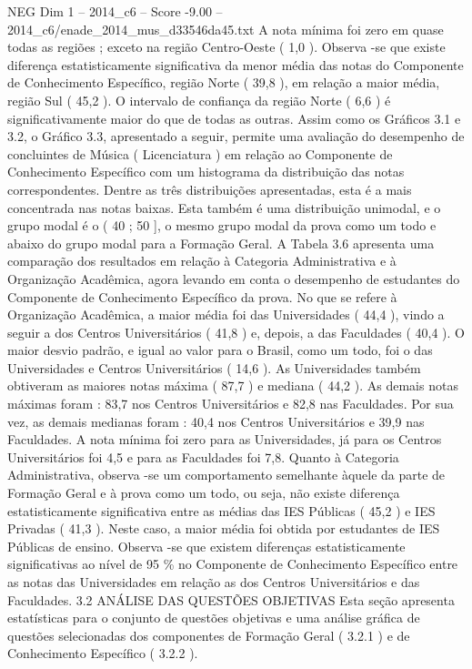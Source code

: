 \begin{textsample}{NEG Dim 1 – 2014\_c6 – Score -9.00 – 2014\_c6/enade\_2014\_mus\_d33546da45.txt}
A nota mínima foi zero em quase todas as regiões ; exceto na região Centro-Oeste ( 1,0 ).
Observa -se que existe diferença estatisticamente significativa da menor média das notas do Componente de Conhecimento Específico, região Norte ( 39,8 ), em relação a maior média, região Sul ( 45,2 ).
O intervalo de confiança da região Norte ( 6,6 ) é significativamente maior do que de todas as outras.
Assim como os Gráficos 3.1 e 3.2, o Gráfico 3.3, apresentado a seguir, permite uma avaliação do desempenho de concluintes de Música ( Licenciatura ) em relação ao Componente de Conhecimento Específico com um histograma da distribuição das notas correspondentes.
Dentre as três distribuições apresentadas, esta é a mais concentrada nas notas baixas.
Esta também é uma distribuição unimodal, e o grupo modal é o ( 40 ; 50 ], o mesmo grupo modal da prova como um todo e abaixo do grupo modal para a Formação Geral.
A Tabela 3.6 apresenta uma comparação dos resultados em relação à Categoria Administrativa e à Organização Acadêmica, agora levando em conta o desempenho de estudantes do Componente de Conhecimento Específico da prova.
No que se refere à Organização Acadêmica, a maior média foi das Universidades ( 44,4 ), vindo a seguir a dos Centros Universitários ( 41,8 ) e, depois, a das Faculdades ( 40,4 ).
O maior desvio padrão, e igual ao valor para o Brasil, como um todo, foi o das Universidades e Centros Universitários ( 14,6 ).
As Universidades também obtiveram as maiores notas máxima ( 87,7 ) e mediana ( 44,2 ).
As demais notas máximas foram : 83,7 nos Centros Universitários e 82,8 nas Faculdades.
Por sua vez, as demais medianas foram : 40,4 nos Centros Universitários e 39,9 nas Faculdades.
A nota mínima foi zero para as Universidades, já para os Centros Universitários foi 4,5 e para as Faculdades foi 7,8.
Quanto à Categoria Administrativa, observa -se um comportamento semelhante àquele da parte de Formação Geral e à prova como um todo, ou seja, não existe diferença estatisticamente significativa entre as médias das IES Públicas ( 45,2 ) e IES Privadas ( 41,3 ).
Neste caso, a maior média foi obtida por estudantes de IES Públicas de ensino.
Observa -se que existem diferenças estatisticamente significativas ao nível de 95 \% no Componente de Conhecimento Específico entre as notas das Universidades em relação as dos Centros Universitários e das Faculdades. 3.2 ANÁLISE DAS QUESTÕES OBJETIVAS Esta seção apresenta estatísticas para o conjunto de questões objetivas e uma análise gráfica de questões selecionadas dos componentes de Formação Geral ( 3.2.1 ) e de Conhecimento Específico ( 3.2.2 ).

\end{textsample}
